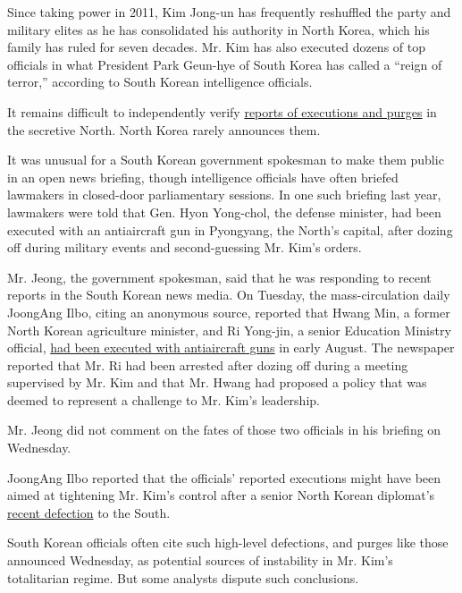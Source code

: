 Since taking power in 2011, Kim Jong-un has frequently reshuffled the
party and military elites as he has consolidated his authority in North
Korea, which his family has ruled for seven decades. Mr. Kim has also
executed dozens of top officials in what President Park Geun-hye of
South Korea has called a ``reign of terror,'' according to South Korean
intelligence officials.

It remains difficult to independently verify
\href{http://thelede.blogs.nytimes3xbfgragh.onion/2014/01/03/inside-the-tale-of-north-korea-execution-by-ravenous-dog/}{reports
of executions and purges} in the secretive North. North Korea rarely
announces them.

It was unusual for a South Korean government spokesman to make them
public in an open news briefing, though intelligence officials have
often briefed lawmakers in closed-door parliamentary sessions. In one
such briefing last year, lawmakers were told that Gen. Hyon Yong-chol,
the defense minister, had been executed with an antiaircraft gun in
Pyongyang, the North's capital, after dozing off during military events
and second-guessing Mr. Kim's orders.

Mr. Jeong, the government spokesman, said that he was responding to
recent reports in the South Korean news media. On Tuesday, the
mass-circulation daily JoongAng Ilbo, citing an anonymous source,
reported that Hwang Min, a former North Korean agriculture minister, and
Ri Yong-jin, a senior Education Ministry official,
\href{http://www.bloomberg.com/news/articles/2016-08-30/kim-has-two-officials-killed-by-anti-aircraft-gun-joongang-says}{had
been executed with antiaircraft guns} in early August. The newspaper
reported that Mr. Ri had been arrested after dozing off during a meeting
supervised by Mr. Kim and that Mr. Hwang had proposed a policy that was
deemed to represent a challenge to Mr. Kim's leadership.

Mr. Jeong did not comment on the fates of those two officials in his
briefing on Wednesday.

JoongAng Ilbo reported that the officials' reported executions might
have been aimed at tightening Mr. Kim's control after a senior North
Korean diplomat's
\href{http://www.nytimes3xbfgragh.onion/2016/08/18/world/asia/north-korea-defector-thae-yong-ho-britain.html}{recent
defection} to the South.

South Korean officials often cite such high-level defections, and purges
like those announced Wednesday, as potential sources of instability in
Mr. Kim's totalitarian regime. But some analysts dispute such
conclusions.

